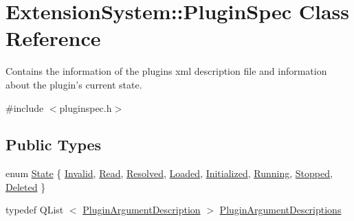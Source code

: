 \hypertarget{class_extension_system_1_1_plugin_spec}{\section{\-Extension\-System\-:\-:\-Plugin\-Spec \-Class \-Reference}
\label{class_extension_system_1_1_plugin_spec}
}


\-Contains the information of the plugins xml description file and information about the plugin's current state.  




{\ttfamily \#include $<$pluginspec.\-h$>$}

\subsection*{\-Public \-Types}
\begin{DoxyCompactItemize}
\item 
enum \hyperlink{class_extension_system_1_1_plugin_spec_a3d40e1bd1f17eb32b314bcd282b3e3b9}{\-State} \{ \*
\hyperlink{class_extension_system_1_1_plugin_spec_a3d40e1bd1f17eb32b314bcd282b3e3b9af4fcbc4b0803e9e7b253ac404c65902c}{\-Invalid}, 
\hyperlink{class_extension_system_1_1_plugin_spec_a3d40e1bd1f17eb32b314bcd282b3e3b9af535b59005757ad8251db519a5f4a7e7}{\-Read}, 
\hyperlink{class_extension_system_1_1_plugin_spec_a3d40e1bd1f17eb32b314bcd282b3e3b9abf1eaab858db15373d08dc8cabbd7cec}{\-Resolved}, 
\hyperlink{class_extension_system_1_1_plugin_spec_a3d40e1bd1f17eb32b314bcd282b3e3b9ae0f34b9f96c75571b3d749b4c6d6e9ff}{\-Loaded}, 
\*
\hyperlink{class_extension_system_1_1_plugin_spec_a3d40e1bd1f17eb32b314bcd282b3e3b9a2695d0fa8246182dcfa36d148ba0706d}{\-Initialized}, 
\hyperlink{class_extension_system_1_1_plugin_spec_a3d40e1bd1f17eb32b314bcd282b3e3b9a7f0dc635a9c4606801a7e8382001e20f}{\-Running}, 
\hyperlink{class_extension_system_1_1_plugin_spec_a3d40e1bd1f17eb32b314bcd282b3e3b9af7d75f1e9edfb5ddf4c01aebc7708abf}{\-Stopped}, 
\hyperlink{class_extension_system_1_1_plugin_spec_a3d40e1bd1f17eb32b314bcd282b3e3b9a30ba387e682bf28d58da8c48829bb029}{\-Deleted}
 \}
\item 
typedef \-Q\-List\*
$<$ \hyperlink{struct_extension_system_1_1_plugin_argument_description}{\-Plugin\-Argument\-Description} $>$ \hyperlink{class_extension_system_1_1_plugin_spec_acf81cc5fcc20b047203f9da886cbbdee}{\-Plugin\-Argument\-Descriptions}
\end{DoxyCompactItemize}
